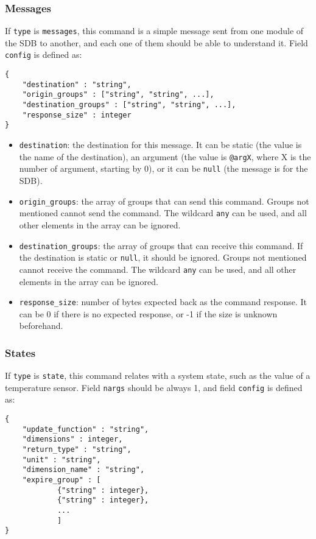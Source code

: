 \documentclass[12pt,a4paper]{report}
\begin{document}
\subsubsection*{Messages}
If \texttt{type} is \texttt{messages}, this command is a simple message sent from one module of the SDB to another, and each one of them should be able to understand it. Field \texttt{config} is defined as:
\begin{lstlisting}
{
    "destination" : "string",
    "origin_groups" : ["string", "string", ...],
    "destination_groups" : ["string", "string", ...],
    "response_size" : integer
}
\end{lstlisting}

\begin{itemize}
\item \texttt{destination}: the destination for this message. It can be static (the value is the name of the destination), an argument (the value is \texttt{@argX}, where X is the number of argument, starting by 0), or it can be \texttt{null} (the message is for the SDB).
\item \texttt{origin\_groups}: the array of groups that can send this command. Groups not mentioned cannot send the command. The wildcard \texttt{any} can be used, and all other elements in the array can be ignored.
\item \texttt{destination\_groups}: the array of groups that can receive this command. If the destination is static or \texttt{null}, it should be ignored. Groups not mentioned cannot receive the command. The wildcard \texttt{any} can be used, and all other elements in the array can be ignored.
\item \texttt{response\_size}: number of bytes expected back as the command response. It can be 0 if there is no expected response, or -1 if the size is unknown beforehand.
\end{itemize}

\subsubsection*{States}
If \texttt{type} is \texttt{state}, this command relates with a system state, such as the value of a temperature sensor. Field \texttt{nargs} should be always 1, and field \texttt{config} is defined as:
\begin{lstlisting}
{
    "update_function" : "string",
    "dimensions" : integer,
    "return_type" : "string",
    "unit" : "string",
    "dimension_name" : "string",
    "expire_group" : [
            {"string" : integer},
            {"string" : integer},
            ...
            ]
}
\end{lstlisting}
\end{document}
